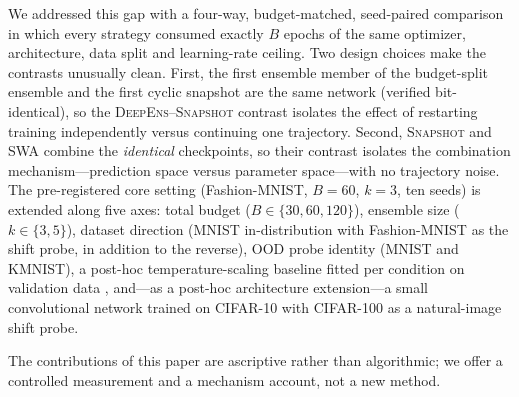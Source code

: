 \documentclass[11pt,a4paper]{article}
\newcommand{\deepens}{\textsc{DeepEns}}
\newcommand{\snapshot}{\textsc{Snapshot}}
\newcommand{\swa}{\textsc{SWA}}
\begin{document}
We addressed this gap with a four-way, budget-matched, seed-paired
comparison in which every strategy consumed exactly $B$ epochs of the same
optimizer, architecture, data split and learning-rate ceiling. Two design
choices make the contrasts unusually clean. First, the first ensemble
member of the budget-split ensemble and the first cyclic snapshot are the
same network (verified bit-identical), so the \deepens{}--\snapshot{}
contrast isolates the effect of restarting training independently versus
continuing one trajectory. Second, \snapshot{} and \swa{} combine the
\emph{identical} checkpoints, so their contrast isolates the combination
mechanism---prediction space versus parameter space---with no trajectory
noise. The pre-registered core setting (Fashion-MNIST, $B=60$, $k=3$, ten
seeds) is extended along five axes: total budget ($B \in
\{30,60,120\}$), ensemble size ($k \in \{3,5\}$), dataset direction
(MNIST in-distribution with Fashion-MNIST as the shift probe, in addition
to the reverse), OOD probe identity (MNIST and KMNIST), a post-hoc
temperature-scaling baseline fitted per condition on validation data
\citep{guo2017,zhang2020}, and---as a post-hoc architecture extension---a
small convolutional network trained on CIFAR-10 with CIFAR-100 as a
natural-image shift probe.

The contributions of this paper are ascriptive rather than algorithmic; we
offer a controlled measurement and a mechanism account, not a new method.
\end{document}
